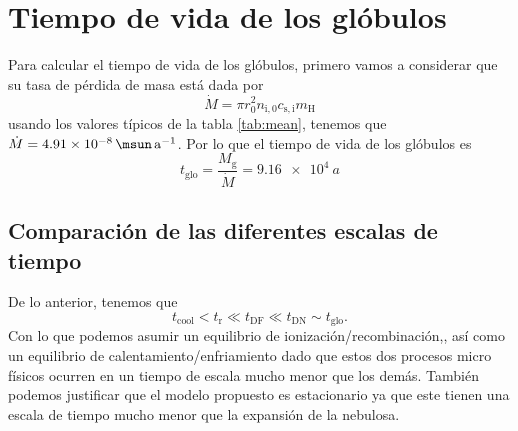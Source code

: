 \documentclass{book}
\begin{document}
\section{Tiempo de vida de los glóbulos}

Para calcular el tiempo de vida de los glóbulos, primero vamos a considerar que su tasa de pérdida de masa está dada por 
\begin{equation}
    \dot{M} =\pi r_0^2n_\mathrm{i,0}c_\mathrm{s,i}m_\mathrm{H}
\end{equation}
usando los valores típicos de la tabla \ref{tab:mean}, tenemos que $\dot{M} = \SI{4.91e-8}{\msun.a^{-1}}$. Por lo que el tiempo de vida de los glóbulos es
\begin{equation}
    t_\mathrm{glo}=\frac{M_\mathrm{g}}{\dot{M}}=\SI{9.16e4}{a}
\end{equation}

\subsection{Comparación de las diferentes escalas de tiempo}

De lo anterior, tenemos que
\begin{equation}
    t_ \mathrm{cool} < t_\mathrm{r} \ll t_\mathrm{DF}  \ll t_\mathrm{DN} \sim t_\mathrm{glo}.
\end{equation}
Con lo que podemos asumir un equilibrio de ionización/recombinación,, así como un equilibrio de calentamiento/enfriamiento dado que estos dos procesos micro físicos ocurren en un tiempo de escala mucho menor que los demás. También podemos justificar que el modelo propuesto es estacionario ya que este tienen una escala de tiempo mucho menor que la expansión de la nebulosa.

\end{document}
